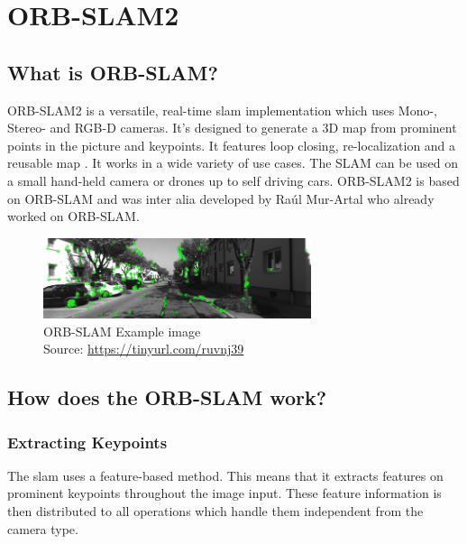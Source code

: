
\chapter{ORB-SLAM2\authorA}\label{ref:orbslam}

\section{What is ORB-SLAM?}
ORB-SLAM2 is a versatile, real-time \gls{slam} implementation which uses Mono-, Stereo- and RGB-D cameras. It's designed to generate a 3D map from prominent points in the picture and keypoints. It features loop closing, re-localization and a reusable map \cite{orbslam2}. It works in a wide variety of use cases. The SLAM can be used on a small hand-held camera or drones up to self driving cars.
ORB-SLAM2 is based on ORB-SLAM and was inter alia developed by Raúl Mur-Artal who already worked on ORB-SLAM.\newline

\begin{figure}[h]
	\centering
	\includegraphics[width=0.7\textwidth]{./media/images/orb-slam-kitti-dataset.png}
  	\caption{ORB-SLAM Example image
  	\\Source: \url{https://tinyurl.com/ruvnj39}}
  	\label{rosstructure}
\end{figure}

\section{How does the ORB-SLAM work?}

\subsection{Extracting Keypoints}
The \gls{slam} uses a feature-based method. This means that it extracts features on prominent keypoints throughout the image input. These feature information is then distributed to all operations which handle them independent from the camera type. \cite{orbslam2} \newline\newline


